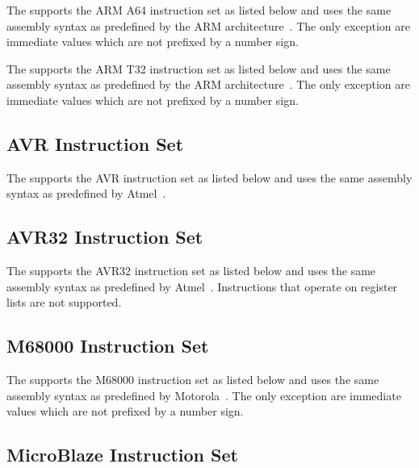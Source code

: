 
The \ecs{} supports the ARM A64 instruction set as listed below and uses the same assembly syntax as predefined by the ARM architecture~\cite{arm:instructionset}.
The only exception are immediate values which are not prefixed by a number sign.


The \ecs{} supports the ARM T32 instruction set as listed below and uses the same assembly syntax as predefined by the ARM architecture~\cite{arm:instructionset}.
The only exception are immediate values which are not prefixed by a number sign.


\subsection{AVR Instruction Set}

The \ecs{} supports the AVR instruction set as listed below and uses the same assembly syntax as predefined by Atmel~\cite{avr:instructionset}.
\seeavr


\subsection{AVR32 Instruction Set}

The \ecs{} supports the AVR32 instruction set as listed below and uses the same assembly syntax as predefined by Atmel~\cite{avr32:instructionset}.
Instructions that operate on register lists are not supported.
\seeavrtt


\subsection{M68000 Instruction Set}

The \ecs{} supports the M68000 instruction set as listed below and uses the same assembly syntax as predefined by Motorola~\cite{m68k:instructionset}.
The only exception are immediate values which are not prefixed by a number sign.
\seemabk


\subsection{MicroBlaze Instruction Set}

